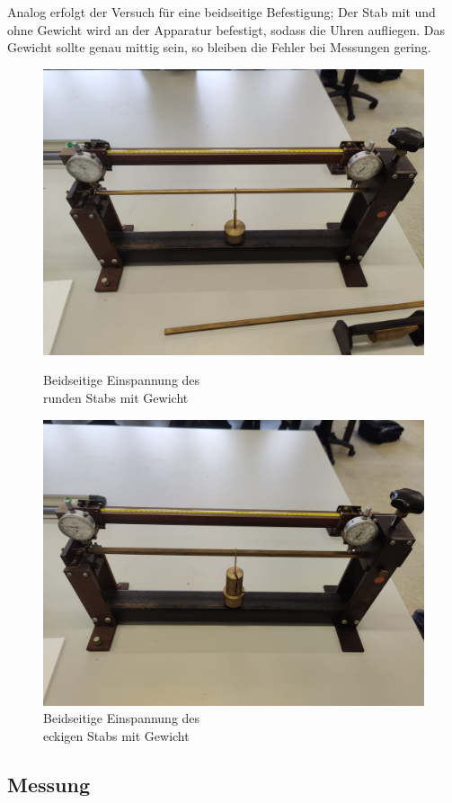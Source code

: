 Analog erfolgt der Versuch für eine beidseitige Befestigung; Der Stab mit und 
ohne Gewicht wird an der Apparatur befestigt, sodass die Uhren aufliegen. Das 
Gewicht sollte genau mittig sein, so bleiben die Fehler bei Messungen gering.
\begin{figure}[h]
    \centering
    \begin{minipage}{0.45\textwidth}
        \centering
        \includegraphics[width=\textwidth]{Bilder/bmG.jpg}
        \caption{Beidseitige Einspannung des \\ runden Stabs mit Gewicht}
    \end{minipage}
    \hfill
    \begin{minipage}{0.45\textwidth}
        \centering
        \includegraphics[width=\textwidth]{Bilder/bmG2.jpg}
        \caption{Beidseitige Einspannung des \\ eckigen Stabs mit Gewicht}
    \end{minipage}
\end{figure}
\subsection{Messung}
